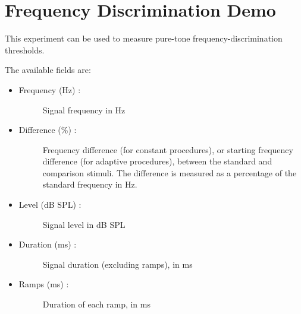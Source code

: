 \documentclass[a4paper,12pt,english]{sphinxmanual}
\begin{document}
\section{Frequency Discrimination Demo}
\label{default_experiments:frequency-discrimination-demo}\label{default_experiments:module-pychoacoustics.default_experiments.freq}
This experiment can be used to measure pure-tone frequency-discrimination
thresholds.

The available fields are:
\begin{itemize}
\item {} \begin{description}
\item[{Frequency (Hz) :}] \leavevmode
Signal frequency in Hz

\end{description}

\item {} \begin{description}
\item[{Difference (\%) :}] \leavevmode
Frequency difference (for constant procedures),
or starting frequency difference (for adaptive procedures),
between the standard and comparison stimuli. The difference
is measured as a percentage of the standard frequency in Hz.

\end{description}

\item {} \begin{description}
\item[{Level (dB SPL) :}] \leavevmode
Signal level in dB SPL

\end{description}

\item {} \begin{description}
\item[{Duration (ms) :}] \leavevmode
Signal duration (excluding ramps), in ms

\end{description}

\item {} \begin{description}
\item[{Ramps (ms) :}] \leavevmode
Duration of each ramp, in ms

\end{description}

\end{itemize}
\end{document}

